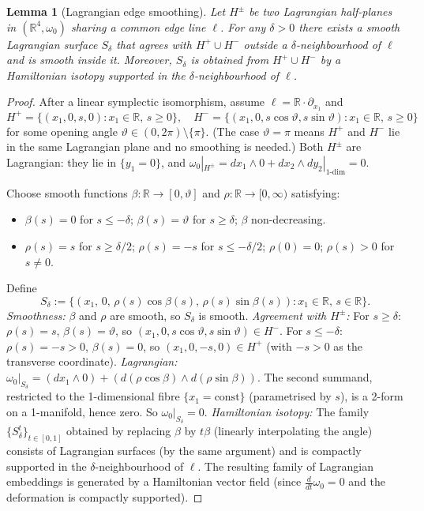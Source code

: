 \documentclass[12pt]{article}
\newtheorem{lemma}[theorem]{Lemma}
\theoremstyle{definition}
\newcommand{\R}{\mathbb{R}}
\newcommand{\om}{\omega}
\begin{document}
\begin{lemma}[Lagrangian edge smoothing]\label{lem:edge}
Let $H^\pm$ be two Lagrangian half-planes in $(\R^4,\om_0)$ sharing a
common edge line $\ell$.  For any $\delta>0$ there exists a smooth
Lagrangian surface $S_\delta$ that agrees with $H^+\cup H^-$ outside a
$\delta$-neighbourhood of $\ell$ and is smooth inside it.  Moreover,
$S_\delta$ is obtained from $H^+\cup H^-$ by a Hamiltonian isotopy
supported in the $\delta$-neighbourhood of $\ell$.
\end{lemma}

\begin{proof}
After a linear symplectic isomorphism, assume $\ell=\R\cdot\partial_{x_1}$
and
\[
  H^+=\{(x_1,0,s,0):x_1\in\R,\,s\ge0\},\quad
  H^-=\{(x_1,0,s\cos\vartheta,s\sin\vartheta):x_1\in\R,\,s\ge0\}
\]
for some opening angle $\vartheta\in(0,2\pi)\setminus\{\pi\}$.  (The
case $\vartheta=\pi$ means $H^+$ and $H^-$ lie in the same Lagrangian
plane and no smoothing is needed.)  Both $H^\pm$ are Lagrangian: they
lie in $\{y_1=0\}$, and $\om_0|_{H^\pm}=dx_1\wedge 0+dx_2\wedge
dy_2|_{1\text{-dim}}=0$.

Choose smooth functions $\beta:\R\to[0,\vartheta]$ and
$\rho:\R\to[0,\infty)$ satisfying:
\begin{itemize}
  \item $\beta(s)=0$ for $s\le-\delta$; $\beta(s)=\vartheta$ for $s\ge\delta$;
        $\beta$ non-decreasing.
  \item $\rho(s)=s$ for $s\ge\delta/2$; $\rho(s)=-s$ for $s\le-\delta/2$;
        $\rho(0)=0$; $\rho(s)>0$ for $s\ne0$.
\end{itemize}
Define
\begin{equation}\label{eq:edge_surface}
  S_\delta:=\{(x_1,\,0,\,\rho(s)\cos\beta(s),\,
             \rho(s)\sin\beta(s)):x_1\in\R,\,s\in\R\}.
\end{equation}
\emph{Smoothness:} $\beta$ and $\rho$ are smooth, so $S_\delta$ is smooth.
\emph{Agreement with $H^\pm$:} For $s\ge\delta$: $\rho(s)=s$,
$\beta(s)=\vartheta$, so $(x_1,0,s\cos\vartheta,s\sin\vartheta)\in H^-$.
For $s\le-\delta$: $\rho(s)=-s>0$, $\beta(s)=0$, so
$(x_1,0,-s,0)\in H^+$ (with $-s>0$ as the transverse coordinate).
\emph{Lagrangian:} $\om_0|_{S_\delta}=(dx_1\wedge 0)+(d(\rho\cos\beta)\wedge
d(\rho\sin\beta))$.  The second summand, restricted to the
1-dimensional fibre $\{x_1=\text{const}\}$ (parametrised by $s$),
is a 2-form on a 1-manifold, hence zero.  So $\om_0|_{S_\delta}=0$.
\emph{Hamiltonian isotopy:} The family $\{S_\delta^t\}_{t\in[0,1]}$
obtained by replacing $\beta$ by $t\beta$ (linearly interpolating the
angle) consists of Lagrangian surfaces (by the same argument) and is
compactly supported in the $\delta$-neighbourhood of $\ell$.  The
resulting family of Lagrangian embeddings is generated by a Hamiltonian
vector field (since $\frac{d}{dt}\om_0=0$ and the deformation is
compactly supported).
\end{proof}
\end{document}
